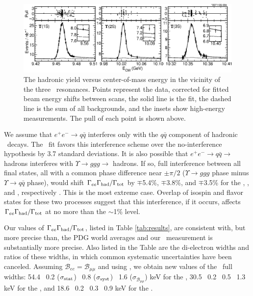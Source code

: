 \documentclass[aps,prd,preprint,superscriptaddress,tightenlines,nofootinbib]{revtex4}
\begin{document}
\begin{figure}
  \includegraphics[width=\linewidth]{fits}
  \caption{\label{fig:fits} The hadronic yield versus center-of-mass
energy in the vicinity of the three \ups\ resonances.  Points
represent the data, corrected for fitted beam energy shifts between
scans, the solid line is the fit, the dashed line is the sum of all
backgrounds, and the insets show high-energy measurements.  The pull
of each point is shown above.}
\end{figure}

We assume that $e^+e^- \to q\bar{q}$ interferes only with the
$q\bar{q}$ component of hadronic \ups\ decays.  The \us\ fit favors
this interference scheme over the no-interference hypothesis by 3.7
standard deviations.  It is also possible that $e^+e^- \to q\bar{q}
\to$ hadrons interferes with $\Upsilon \to ggg \to$ hadrons.  If so,
full interference between all final states, all with a common phase
difference near $\pm\pi/2$ ($\Upsilon \to ggg$ \mbox{phase}
\mbox{minus} $\Upsilon \to q\bar{q}$ phase), would shift $\Gamma_{ee}\Gamma_{\mbox{\scriptsize had}}/\Gamma_{\mbox{\scriptsize tot}}$
by $\mp$5.4\%, $\mp$3.8\%, and $\mp$3.5\% for the \us, \uss, and
\usss, respectively \cite{thesis}.  This is the most extreme case.
Overlap of isospin and flavor states for these two processes suggest
that this interference, if it occurs, affects $\Gamma_{ee}\Gamma_{\mbox{\scriptsize had}}/\Gamma_{\mbox{\scriptsize tot}}$ at no more
than the $\sim$1\% level.

Our values of $\Gamma_{ee}\Gamma_{\mbox{\scriptsize had}}/\Gamma_{\mbox{\scriptsize tot}}$, listed in Table \ref{tab:results}, are
consistent with, but more precise than, the PDG world averages
\cite{pdg} and our \usss\ measurement is substantially more precise.
Also listed in the Table are the di-electron widths and ratios of
these widths, in which common systematic uncertainties have been
canceled.  Assuming ${\mathcal B}_{ee} = {\mathcal B}_{\mu\mu}$
and using \cite{istvan}, we obtain new values of the \ups\ full
widths: 54.4 \PM\ 0.2 ($\sigma_{\mbox{\scriptsize stat}}$) \PM\ 0.8
($\sigma_{\mbox{\scriptsize syst}}$) \PM\ 1.6 ($\sigma_{{\mathcal
B}_{\mu\mu}}$) keV for the \us, 30.5 \PM\ 0.2 \PM\ 0.5 \PM\ 1.3 keV
for the \uss, and 18.6 \PM\ 0.2 \PM\ 0.3 \PM\ 0.9 keV for the \usss.
\end{document}
